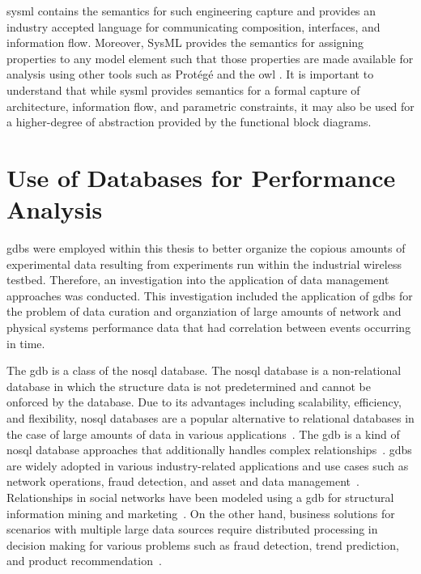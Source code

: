 \Gls{sysml} contains the semantics for such engineering capture and provides an industry accepted language for communicating composition, interfaces, and information flow. Moreover, SysML provides the semantics for assigning properties to any model element such that those properties are made  available for analysis using other tools such as Prot\'eg\'e \cite{StanfordUniversity.Protege} and the \gls{owl} \cite{W3C2012.OWL}.
It is important to understand that while \gls{sysml} provides semantics for a formal capture of architecture, information flow, and parametric constraints, it may also be used for a higher-degree of abstraction provided by the functional block diagrams.  

\section{Use of Databases for Performance Analysis}
\Glspl{gdb} were employed within this thesis to better organize the copious amounts of experimental data resulting from experiments run within the industrial wireless testbed.  Therefore, an investigation into the application of data management approaches was conducted.  This investigation included the application of \glspl{gdb} for the problem of data curation and organziation of large amounts of network and physical systems performance data that had correlation between events occurring in time.

The \gls{gdb} is a class of the \gls{nosql} database.  The \gls{nosql} database is a non-relational database in which the structure data is not predetermined and cannot be onforced by the database.  Due to its advantages including scalability, efficiency, and flexibility, \gls{nosql} databases are a popular alternative to relational databases in the case of large amounts of data in various applications~\cite{doi:10.1108/17440081311316398}. The \gls{gdb} is a kind of \gls{nosql} database approaches that additionally handles complex relationships~\cite{8123475}. \Glspl{gdb} are widely adopted in various industry-related applications and use cases such as network operations, fraud detection, and asset and data management~\cite{top5}. Relationships in social networks have been modeled using a \gls{gdb} for structural information mining and marketing~\cite{Gomez-Rodriguez:2012:IND:2086737.2086741}. On the other hand, business solutions for scenarios with multiple large data sources require distributed processing in decision making for various problems such as fraud detection, trend prediction, and product recommendation~\cite{Skhiri2013}.

